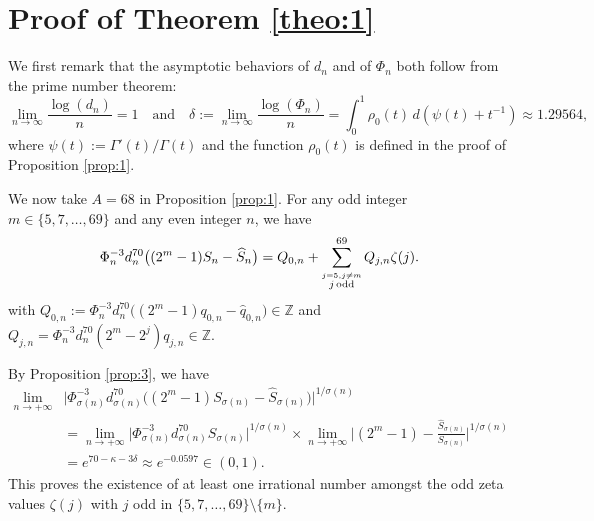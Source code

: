 \documentclass[reqno,12pt]{article}
\theoremstyle{remark}
\begin{document}
\section{Proof of Theorem \ref{theo:1}}\label{sec:5}
We first remark that the asymptotic behaviors of $d_n$ and of $\Phi_n$  both follow from the prime number theorem:
$$
\lim_{n\to\infty}\frac{\log(d_n)}n=1
\quad\text{and}\quad
\delta:=\lim_{n\to\infty}\frac{\log(\Phi_n)}n=\int_0^1\rho_0(t)\,d(\psi(t)+t^{-1})
\approx 1.29564, 
$$
where $\psi(t):=\Gamma'(t)/\Gamma(t)$ and the function $\rho_0(t)$ is defined in the proof of Proposition \ref{prop:1}.


We now take $A=68$ in Proposition \ref{prop:1}. 
For any odd integer $m\in \{5,7,\ldots, 69\}$ and any even integer $n$, we have
$$
\Phi_n^{-3}d_n^{70}\big((2^m-1)S_n-\widehat{S}_n\big)=Q_{0,n}+\sum_{\stackrel{j=5, j\neq m}{j\, \textup{odd}}}^{69} Q_{j,n} \zeta(j).
$$
with $Q_{0,n} := \Phi_n^{-3}d_n^{70}\big((2^m-1)q_{0,n}-\widehat{q}_{0,n}\big) \in \mathbb Z$ and $Q_{j,n}=\Phi_n^{-3}d_n^{70}(2^m-2^j)q_{j,n} \in \mathbb Z$.

By Proposition \ref{prop:3}, we have  
\begin{align*}
\lim_{n\to +\infty} &\Big\vert \Phi_{\sigma(n)}^{-3}d_{\sigma(n)}^{70}\big((2^m-1)S_{\sigma(n)}-\widehat{S}_{\sigma(n)}\big) \Big\vert^{1/\sigma(n)}\\
&=\lim_{n\to +\infty} \big\vert \Phi_{\sigma(n)}^{-3}d_{\sigma(n)}^{70}S_{\sigma(n)} \big\vert^{1/\sigma(n)} \times\lim_{n\to +\infty} \bigg\vert (2^m-1)-\frac{\widehat{S}_{\sigma(n)}}{S_{\sigma(n)}} \bigg\vert^{1/\sigma(n)} 
\\&
= e^{70-\kappa-3\delta} \approx e^{-0.0597} \in (0,1).
\end{align*}
This proves the existence of at least one irrational number amongst the odd zeta values $\zeta(j)$ with $j$ odd in $\{5,7, \ldots, 69\}\setminus\{m\}$.
\end{document}
